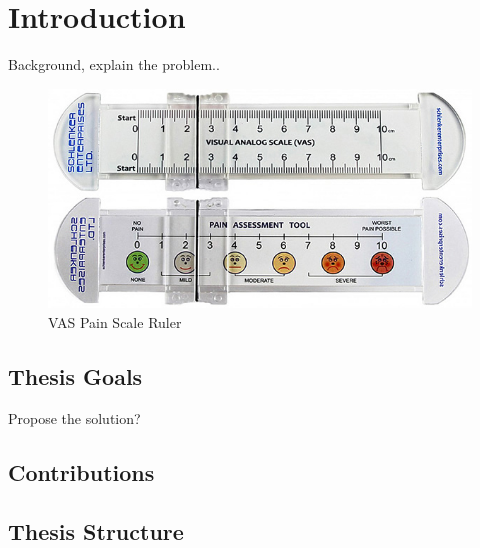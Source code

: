 \chapter{Introduction}

Background, explain the problem..


\begin{figure}[h!]
    \centering
    \includegraphics[width=1\textwidth]{figures/real_vas.jpg}
    \caption{VAS Pain Scale Ruler\cite{real_vas}}
    \label{real_vas}
\end{figure}

\section{Thesis Goals}

Propose the solution?

\section{Contributions}

\section{Thesis Structure}